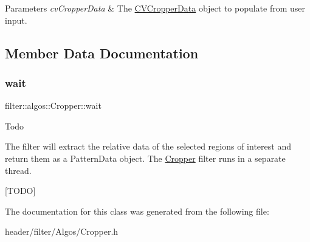 \begin{DoxyParams}{Parameters}
{\em cv\+Cropper\+Data} & The \hyperlink{classfilter_1_1algos_1_1_cropper_1_1_c_v_cropper_data}{C\+V\+Cropper\+Data} object to populate from user input. \\
\hline
\end{DoxyParams}


\subsection{Member Data Documentation}
\mbox{\label{classfilter_1_1algos_1_1_cropper_ac7cf2a54e81d9227dc22b46d54603c7e}} 
\subsubsection{\texorpdfstring{wait}{wait}}
{\footnotesize\ttfamily filter\+::algos\+::\+Cropper\+::wait}

\begin{DoxyRefDesc}{Todo}
\item[\hyperlink{todo__todo000006}{Todo}]\end{DoxyRefDesc}
The filter will extract the relative data of the selected regions of interest and return them as a Pattern\+Data object. The \hyperlink{classfilter_1_1algos_1_1_cropper}{Cropper} filter runs in a separate thread.

\mbox{[}T\+O\+DO\mbox{]} 

The documentation for this class was generated from the following file\+:\begin{DoxyCompactItemize}
\item 
header/filter/\+Algos/Cropper.\+h\end{DoxyCompactItemize}
